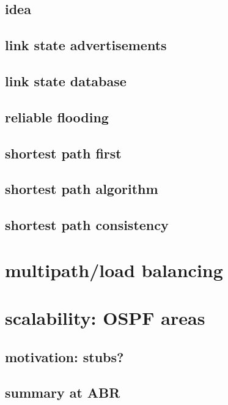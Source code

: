 \subsection{idea}

\subsection{link state advertisements}

\subsection{link state database}

\subsection{reliable flooding}


\subsection{shortest path first}


\subsection{shortest path algorithm}


\subsection{shortest path consistency}


\section{multipath/load balancing}


\section{scalability: OSPF areas} %

\subsection{motivation: stubs?}

\subsection{summary at ABR}

